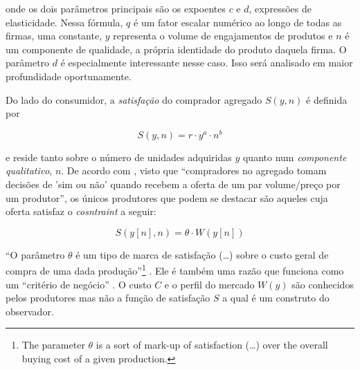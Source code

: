 \documentclass[a4paper, 12pt, openright, oneside, german, french, english, brazil]{abntex2}
\begin{document}
	onde os dois parâmetros principais são os expoentes $c$ e $d$, expressões de elasticidade. Nessa fórmula, $q$ é um fator escalar numérico ao longo de todas as firmas, uma constante, $y$ representa o volume de engajamentos de produtos e $n$ é um componente de qualidade, a própria identidade do produto daquela firma. O parâmetro $d$ é especialmente interessante nesse caso. Isso será analisado em maior profundidade oportunamente.
	
	Do lado do consumidor, a \textit{satisfação} do comprador agregado $ S(y, n) $ é definida por 

	\begin{equation}
	\label{satisfaction}
	S(y, n) = r \cdot y^a \cdot n^b 	
	\end{equation}
	
	e reside tanto sobre o número de unidades adquiridas $y$ quanto num \textit{componente qualitativo}, $n$. De acordo com , visto que ``compradores no agregado tomam decisões de 'sim ou não' quando recebem a oferta de um par volume/preço por um produtor'', os únicos produtores que podem se destacar são aqueles cuja oferta satisfaz o \textit{cosntraint} a seguir:
	
	\begin{equation}
	\label{S-theta}
	S(y[n], n) = \theta \cdot W(y[n])	
	\end{equation}
	
	
	``O parâmetro $\theta$ é um tipo de marca de satisfação (\dots) sobre o custo geral de compra de uma dada produção''\footnote{The parameter $\theta$ is a sort of mark-up of satisfaction (\dots) over the overall buying cost of a given production.} \cite[p. 217]{favereau2002markets}. Ele é também uma razão que funciona como um ``critério de negócio'' \cite[p. 39]{white2002markets}. O custo $C$ e o perfil do mercado $W(y)$ são conhecidos pelos produtores mas não a função de satisfação $S$ a qual é um construto do observador.
	
	
	
	
\end{document}
